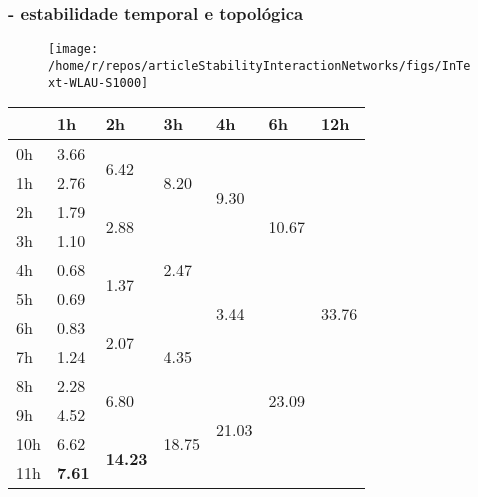 \documentclass[10pt]{beamer}
\begin{document}
\begin{frame}
\frametitle{- estabilidade temporal e topológica}

\vspace{-.2cm}
\begin{figure} 
	\centering
	\texttt{[image: /home/r/repos/articleStabilityInteractionNetworks/figs/InText-WLAU-S1000]}
\end{figure}
\vspace{-.2cm}

	\begin{minipage}[t]{0.48\linewidth}
\begin{table}
	\tiny
\begin{center} 
	\begin{tabular}{| p{.2cm} || p{.37cm} | p{.37cm} | p{.37cm} | p{.37cm} | p{.37cm} | p{.37cm} |}\hline 
  & 1h & 2h & 3h & 4h & 6h & 12h \\\hline 
 0h  &\multirow{1}{*}{3.66 }   &\multirow{2}{*}{6.42 }   &\multirow{3}{*}{8.20 }   &\multirow{4}{*}{9.30 }   &\multirow{6}{*}{10.67 }   &\multirow{12}{*}{33.76 }  \\\cline{2-2} 
 1h  &\multirow{1}{*}{2.76 }   &   &   &   &   &  \\\cline{2-2}\cline{3-3} 
 2h  &\multirow{1}{*}{1.79 }   &\multirow{2}{*}{2.88 }   &   &   &   &  \\\cline{2-2}\cline{4-4} 
 3h  &\multirow{1}{*}{1.10 }   &   &\multirow{3}{*}{2.47 }   &   &   &  \\\cline{2-2}\cline{3-3}\cline{5-5} 
 4h  &\multirow{1}{*}{0.68 }   &\multirow{2}{*}{1.37 }   &   &\multirow{4}{*}{3.44 }   &   &  \\\cline{2-2} 
 5h  &\multirow{1}{*}{0.69 }   &   &   &   &   &  \\\cline{2-2}\cline{3-3}\cline{4-4}\cline{6-6} 
 6h  &\multirow{1}{*}{0.83 }   &\multirow{2}{*}{2.07 }   &\multirow{3}{*}{4.35 }   &   &\multirow{6}{*}{23.09 }   &  \\\cline{2-2} 
 7h  &\multirow{1}{*}{1.24 }   &   &   &   &   &  \\\cline{2-2}\cline{3-3}\cline{5-5} 
 8h  &\multirow{1}{*}{2.28 }   &\multirow{2}{*}{6.80 }   &   &\multirow{4}{*}{21.03 }   &   &  \\\cline{2-2}\cline{4-4} 
 9h  &\multirow{1}{*}{4.52 }   &   &\multirow{3}{*}{18.75 }   &   &   &  \\\cline{2-2}\cline{3-3} 
 10h  &\multirow{1}{*}{6.62 }   &\multirow{2}{*}{\textbf{14.23} }   &   &   &   &  \\\cline{2-2} 
 11h  &\multirow{1}{*}{\textbf{7.61} }   &   &   &   &   &  \\\cline{2-2}\cline{3-3}\cline{4-4}\cline{5-5}\cline{6-6}\cline{7-7} 

\end{tabular}
\end{center}
\end{table}
\end{minipage}
\end{frame}
\end{document}
